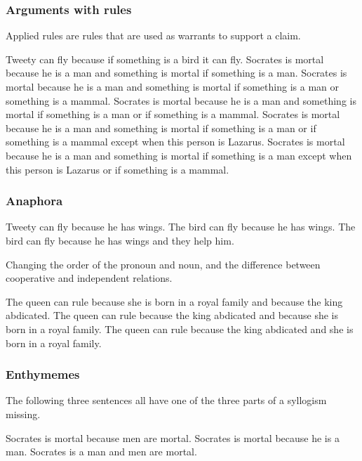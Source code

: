 \subsubsection{Arguments with rules}
Applied rules are rules that are used as warrants to support a claim.
\begin{exe}
\ex\label{e90} Tweety can fly because if something is a bird it can fly.
\ex\label{e91} Socrates is mortal because he is a man and something is mortal if something is a man.
\ex\label{e92} Socrates is mortal because he is a man and something is mortal if something is a man or something is a mammal.
\ex\label{e93} Socrates is mortal because he is a man and something is mortal if something is a man or if something is a mammal.
\ex\label{e94} Socrates is mortal because he is a man and something is mortal if something is a man or if something is a mammal except when this person is Lazarus.
\ex\label{e95} Socrates is mortal because he is a man and something is mortal if something is a man except when this person is Lazarus or if something is a mammal.
\end{exe}

\subsubsection{Anaphora}
\begin{exe}
\ex\label{e59} Tweety can fly because he has wings.
\ex\label{e60} The bird can fly because he has wings.
\ex\label{e61} The bird can fly because he has wings and they help him.
\end{exe}

\noindent Changing the order of the pronoun and noun, and the difference between cooperative and independent relations.
\begin{exe}
\ex\label{e62} The queen can rule because she is born in a royal family and because the king abdicated.
\ex\label{e63} The queen can rule because the king abdicated and because she is born in a royal family.
\ex\label{e71} The queen can rule because the king abdicated and she is born in a royal family.
\end{exe}

\subsubsection{Enthymemes}
The following three sentences all have one of the three parts of a syllogism missing.
\begin{exe}
\ex\label{e120} Socrates is mortal because men are mortal.
\ex\label{e121} Socrates is mortal because he is a man.
\ex\label{e122} Socrates is a man and men are mortal.
\end{exe}

